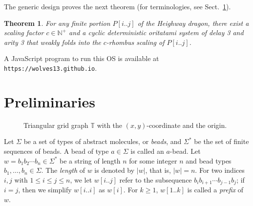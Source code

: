 \documentclass[dvipdfmx,review]{elsarticle}
\newtheorem{theorem}{Theorem}
\begin{document}
The generic design proves the next theorem (for terminologies, see Sect.~\ref{sect:preliminaries}). 

\begin{theorem}\label{thm:main}
	For any finite portion $P[i..j]$ of the Heighway dragon, there exist a scaling factor $c \in \mathbb{N}^+$ and a cyclic deterministic oritatami system of delay 3 and arity 3 that weakly folds into the $c$-rhombus scaling of $P[i..j]$. 
\end{theorem}

\noindent
A JavaScript program to run this OS is available at {\small {\tt https://wolves13.github.io}}. 


	\section{Preliminaries}
	\label{sect:preliminaries}

\begin{figure}[h]
\centering
{}
\caption{Triangular grid graph $\mathbb{T}$ with the $(x, y)$-coordinate and the origin.}
\label{fig:triangular_grid}
\end{figure}

Let $\Sigma$ be a set of types of abstract molecules, or \textit{beads}, and $\Sigma^*$ be the set of finite sequences of beads. 
A bead of type $a \in \Sigma$ is called an $a$-bead. 
Let $w = b_1 b_2\cdots b_n \in \Sigma^*$ be a string of length $n$ for some integer $n$ and bead types $b_1, \ldots, b_n \in \Sigma$.
The \textit{length} of $w$ is denoted by $|w|$, that is, $|w| = n$. 
For two indices $i,j$ with $1\leq i \leq j \leq n$, we let $w[i..j]$ refer to the subsequence $b_i b_{i+1} \cdots b_{j-1} b_{j}$; if $i=j$, then we simplify $w[i..i]$ as $w[i]$.
For $k \ge 1$, $w[1..k]$ is called a \textit{prefix} of $w$. 
\end{document}
